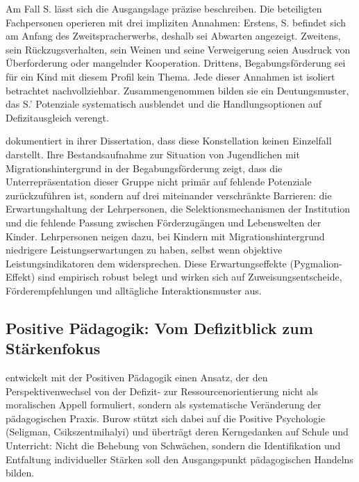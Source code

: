 \documentclass[ngerman, a4paper]{article}
\begin{document}
Am Fall S. lässt sich die Ausgangslage präzise beschreiben. Die beteiligten
Fachpersonen operieren mit drei impliziten Annahmen: Erstens, S. befindet sich am
Anfang des Zweitspracherwerbs, deshalb sei Abwarten angezeigt. Zweitens, sein
Rückzugsverhalten, sein Weinen und seine Verweigerung seien Ausdruck von
Überforderung oder mangelnder Kooperation. Drittens, Begabungsförderung sei für
ein Kind mit diesem Profil kein Thema. Jede dieser Annahmen ist isoliert betrachtet
nachvollziehbar. Zusammengenommen bilden sie ein Deutungsmuster, das S.' Potenziale
systematisch ausblendet und die Handlungsoptionen auf Defizitausgleich verengt.

\textcite{leikhof2021jugendliche} dokumentiert in ihrer Dissertation, dass diese Konstellation keinen
Einzelfall darstellt. Ihre Bestandsaufnahme zur Situation von Jugendlichen mit
Migrationshintergrund in der Begabungsförderung zeigt, dass die Unterrepräsentation
dieser Gruppe nicht primär auf fehlende Potenziale zurückzuführen ist, sondern auf
drei miteinander verschränkte Barrieren: die Erwartungshaltung der Lehrpersonen,
die Selektionsmechanismen der Institution und die fehlende Passung zwischen
Förderzugängen und Lebenswelten der Kinder. Lehrpersonen neigen dazu, bei Kindern
mit Migrationshintergrund niedrigere Leistungserwartungen zu haben, selbst wenn
objektive Leistungsindikatoren dem widersprechen. Diese Erwartungseffekte
(Pygmalion-Effekt) sind empirisch robust belegt und wirken sich auf
Zuweisungsentscheide, Förderempfehlungen und alltägliche Interaktionsmuster aus.

\subsection{Positive Pädagogik: Vom Defizitblick zum Stärkenfokus}

\textcite{burow2021positive} entwickelt mit der Positiven Pädagogik einen Ansatz, der den
Perspektivenwechsel von der Defizit- zur Ressourcenorientierung nicht als moralischen
Appell formuliert, sondern als systematische Veränderung der pädagogischen Praxis.
Burow stützt sich dabei auf die Positive Psychologie (Seligman, Csikszentmihalyi) und
überträgt deren Kerngedanken auf Schule und Unterricht: Nicht die Behebung von
Schwächen, sondern die Identifikation und Entfaltung individueller Stärken soll den
Ausgangspunkt pädagogischen Handelns bilden.
\end{document}
